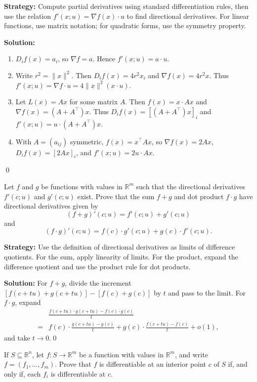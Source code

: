 \noindent\textbf{Strategy:} Compute partial derivatives using standard differentiation rules, then use the relation \( f'(x; u) = \nabla f(x) \cdot u \) to find directional derivatives. For linear functions, use matrix notation; for quadratic forms, use the symmetry property.

\bigskip\noindent\textbf{Solution:}
\begin{enumerate}[label=(\alph*)]
\item $D_i f(x)=a_i$, so $\nabla f=a$. Hence $f'(x;u)=a\cdot u$.
\item Write $r^2=\|x\|^2$. Then $D_i f(x)=4r^2 x_i$ and $\nabla f(x)=4r^2 x$. Thus $f'(x;u)=\nabla f\cdot u=4\|x\|^2(x\cdot u)$.
\item Let $L(x)=Ax$ for some matrix $A$. Then $f(x)=x\cdot Ax$ and $\nabla f(x)=(A+A^{\!\top})x$. Thus $D_i f(x)=[(A+A^{\!\top})x]_i$ and $f'(x;u)=u\cdot (A+A^{\!\top})x$.
\item With $A=(a_{ij})$ symmetric, $f(x)=x^{\!\top}Ax$, so $\nabla f(x)=2Ax$, $D_i f(x)=[2Ax]_i$, and $f'(x;u)=2u\cdot Ax$.
\end{enumerate}\qed


\begin{problembox}
Let \( f \) and \( g \) be functions with values in \( \mathbb{R}^m \) such that the directional derivatives \( f'(c; u) \) and \( g'(c; u) \) exist. Prove that the sum \( f + g \) and dot product \( f \cdot g \) have directional derivatives given by
\[(f + g)'(c; u) = f'(c; u) + g'(c; u)\]
and
\[(f \cdot g)'(c; u) = f(c) \cdot g'(c; u) + g(c) \cdot f'(c; u).\]
\end{problembox}

\noindent\textbf{Strategy:} Use the definition of directional derivatives as limits of difference quotients. For the sum, apply linearity of limits. For the product, expand the difference quotient and use the product rule for dot products.

\bigskip\noindent\textbf{Solution:}
For $f+g$, divide the increment $[f(c+tu)+g(c+tu)]-[f(c)+g(c)]$ by $t$ and pass to the limit. For $f\cdot g$, expand
\begin{align*}
&\frac{f(c+tu)\cdot g(c+tu)-f(c)\cdot g(c)}{t} \\
=&f(c)\cdot\frac{g(c+tu)-g(c)}{t}+g(c)\cdot\frac{f(c+tu)-f(c)}{t}+o(1),
\end{align*}
and take $t\to0$.\qed


\begin{problembox}
If \( S \subseteq \mathbb{R}^n \), let \( f: S \to \mathbb{R}^m \) be a function with values in \( \mathbb{R}^m \), and write \( f = (f_1, \ldots, f_m) \). Prove that \( f \) is differentiable at an interior point \( c \) of \( S \) if, and only if, each \( f_i \) is differentiable at \( c \).
\end{problembox}

